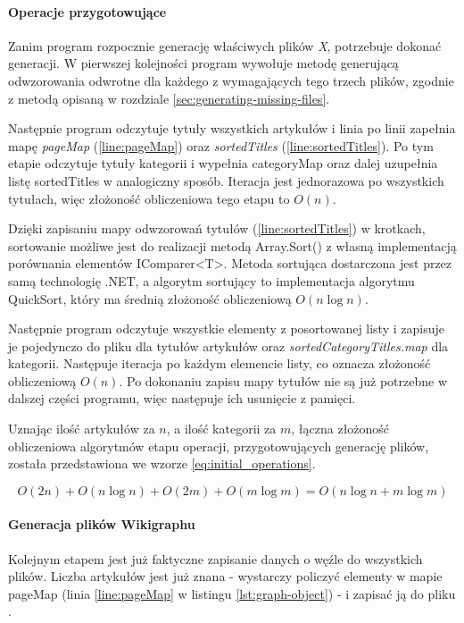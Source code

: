 \paragraph{Operacje przygotowujące}
Zanim program rozpocznie generację właściwych plików \textit{X}, potrzebuje dokonać generacji. W pierwszej kolejności program wywołuje metodę generującą odwzorowania odwrotne dla każdego z wymagających tego trzech plików, zgodnie z metodą opisaną w rozdziale \ref{sec:generating-missing-files}.

Następnie program odczytuje tytuły wszystkich artykułów i linia po linii zapełnia mapę \textit{pageMap} (\ref{line:pageMap}) oraz \textit{sortedTitles} (\ref{line:sortedTitles}). Po tym etapie odczytuje tytuły kategorii i wypełnia categoryMap oraz dalej uzupełnia listę sortedTitles w analogiczny sposób. Iteracja jest jednorazowa po wszystkich tytułach, więc złożoność obliczeniowa tego etapu to $O(n)$.

Dzięki zapisaniu mapy odwzorowań tytułów (\ref{line:sortedTitles}) w krotkach, sortowanie możliwe jest do realizacji metodą Array.Sort() z własną implementacją porównania elementów IComparer<T>. Metoda sortująca dostarczona jest przez samą technologię .NET, a algorytm sortujący to implementacja algorytmu QuickSort, który ma średnią złożoność obliczeniową $O(n\log n)$.

Następnie program odczytuje wszystkie elementy z posortowanej listy i zapisuje je pojedynczo do pliku  dla tytułów artykułów oraz \textit{sortedCategoryTitles.map} dla kategorii. Następuje iteracja po każdym elemencie listy, co oznacza złożoność obliczeniową $O(n)$. Po dokonaniu zapisu mapy tytułów nie są już potrzebne w dalszej części programu, więc następuje ich usunięcie z pamięci.

Uznając ilość artykułów za $n$, a ilość kategorii za $m$, łączna złożoność obliczeniowa algorytmów etapu operacji, przygotowujących generację plików, została przedstawiona we wzorze \ref{eq:initial_operations}.

\begin{equation}
O(2n) + O(n\log n) + O(2m) + O(m \log m) = O(n\log n + m\log m)
\label{eq:initial_operations}
\end{equation}

\paragraph{Generacja plików Wikigraphu}
Kolejnym etapem jest już faktyczne zapisanie danych o węźle do wszystkich plików. Liczba artykułów jest już znana - wystarczy policzyć elementy w mapie pageMap (linia \ref{line:pageMap} w listingu \ref{lst:graph-object}) - i zapisać ją do pliku .

